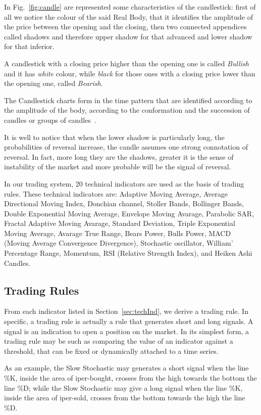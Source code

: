 In Fig.~\ref{fig:candle} are represented some characteristics of the candlestick: first of all we notice the colour of the said Real Body, that it identifies the amplitude of the price between the opening and the closing, then two connected appendices called shadows and therefore upper shadow for that advanced and lower shadow for that inferior.

A candlestick with a closing price higher than the opening one is called \textit{Bullish} and it has \textit{white} colour, while \textit{black} for those ones with a closing price lower than the opening one, called \textit{Bearish}.

The Candlestick charts form in the time pattern that are identified according to the amplitude of the body, according to the conformation and the succession of candles or groups of candles~\cite{OZTURK2016170}.

It is well to notice that when the lower shadow is particularly long, the probabilities of reversal increase, the candle assumes one strong connotation of reversal. In fact, more long they are the shadows, greater it is the sense of instability of the market and more probable will be the signal of reversal.


In our trading system, 20 technical indicators are used as the basis of trading rules. These technical indicators are: Adaptive Moving Average, Average Directional Moving Index, Donchian channel, Stoller Bands, Bollinger Bands, Double Exponential Moving Average, Envelope Moving Avarage, Parabolic SAR, Fractal Adaptive Moving Avarage, Standard Deviation, Triple Exponential Moving Average, Avarage True Range, Bears Power, Bulls Power, MACD (Moving Average Convergence Divergence), Stochastic oscillator, William' Percentage Range, Momentum, RSI (Relative Strength Index), and Heiken Ashi Candles.

\subsection{Trading Rules}
From each indicator listed in Section~\ref{sec:techInd}, we derive a trading rule. In specific, a trading rule is actually a rule that generates short and long signals. A signal is an indication to open a position on the market. In its simplest form, a trading rule may be such as comparing the value of an indicator against a threshold, that can be fixed or dynamically attached to a time series.

\noindent As an example, the Slow Stochastic may generates a short signal when the line \%K, inside the area of iper-bought, crosses from the high towards the bottom the line \%D; while the Slow Stochastic may give a long signal when the line \%K, inside the area of iper-sold, crosses from the bottom towards the high the line \%D.


